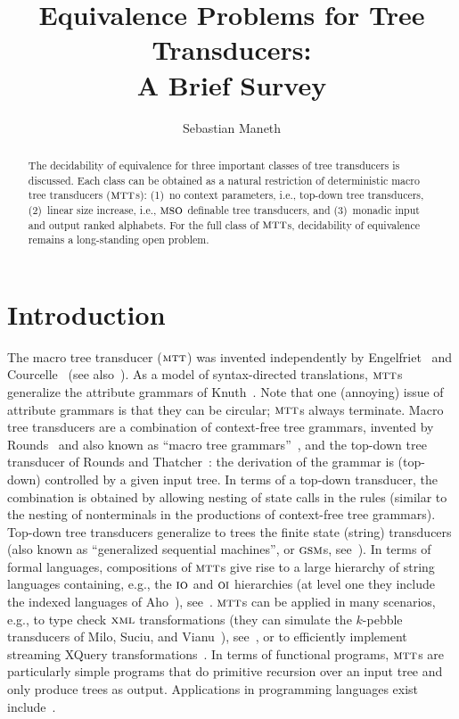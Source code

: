 \documentclass[copyright,creativecommons]{eptcs}
\title{Equivalence Problems for Tree Transducers:\\A Brief Survey}
\author{Sebastian Maneth
\institute{School of Informatics\\University of Edinburgh}
\email{smaneth@inf.ed.ac.uk}
}
\newcommand{\mtt}{\textsc{mtt}}
\newcommand{\mso}{\textsc{mso}}
\newcommand{\xml}{\textsc{xml}}
\newcommand{\gsm}{\textsc{gsm}}
\newcommand{\io}{\textsc{io}}
\newcommand{\oi}{\textsc{oi}}
\begin{document}
\maketitle
\begin{abstract}
The decidability of equivalence for three important classes of tree transducers is discussed. 
Each class can be obtained as a natural restriction of deterministic macro tree transducers ($\mtt$s):
(1)~no context parameters, i.e., top-down tree transducers,
(2)~linear size increase, i.e., $\mso$ definable tree transducers, and
(3)~monadic input and output ranked alphabets.
For the full class of $\mtt$s, decidability of equivalence remains a long-standing open problem.
\end{abstract}
\section{Introduction}

The macro tree transducer ($\mtt$) was invented independently by
Engelfriet~\cite{eng80,DBLP:journals/jcss/EngelfrietV85}
and Courcelle~\cite{DBLP:journals/tcs/CourcelleF82,DBLP:journals/tcs/CourcelleF82a} 
(see also~\cite{DBLP:series/eatcs/FulopV98}).
As a model of syntax-directed translations, $\mtt$s generalize the
attribute grammars of Knuth~\cite{DBLP:journals/mst/Knuth68}. 
Note that one (annoying) issue of attribute
grammars is that they can be circular; $\mtt$s always terminate.
Macro tree transducers are a combination of context-free
tree grammars, invented by Rounds~\cite{DBLP:conf/stoc/Rounds69} and 
also known as ``macro tree grammars''~\cite{fis68}, and 
the top-down tree transducer of Rounds and 
Thatcher~\cite{DBLP:journals/mst/Rounds70,DBLP:journals/jcss/Thatcher70}:
the derivation of the grammar is (top-down) controlled by a given
input tree. In terms of a top-down transducer, the combination is
obtained by allowing nesting of state calls in the rules
(similar to the nesting of nonterminals in the productions of context-free tree grammars).
Top-down tree transducers generalize to trees the
finite state (string) transducers (also known as ``generalized sequential machines'', 
or $\gsm$s, 
see~\cite{gin66,Berstel79transductionsand}).
In terms of formal languages, compositions of $\mtt$s
give rise to
 a large hierarchy of string languages containing, e.g., the $\io$ and $\oi$ hierarchies
(at level one they include the indexed languages of Aho~\cite{DBLP:journals/jacm/Aho68}),
see~\cite{DBLP:journals/jcss/EngelfrietM02}.
$\mtt$s can be applied in many scenarios, e.g., to type check
$\xml$ transformations 
(they can simulate the $k$-pebble transducers of Milo, Suciu, and Vianu~\cite{DBLP:journals/jcss/MiloSV03}),
see~\cite{DBLP:journals/acta/EngelfrietM03,DBLP:conf/pods/ManethBPS05,DBLP:conf/icdt/ManethPS07}, or
to efficiently implement streaming XQuery transformations~\cite{icde2014,DBLP:conf/aplas/NakanoM06}.
In terms of functional programs, $\mtt$s are particularly simple
programs that do primitive recursion over an input tree and 
only produce trees as output. Applications in programming 
languages exist 
include~\cite{DBLP:journals/scp/Vogler91,DBLP:phd/de/Voigtlander2005,DBLP:conf/aplas/NakanoM06}.
\end{document}

